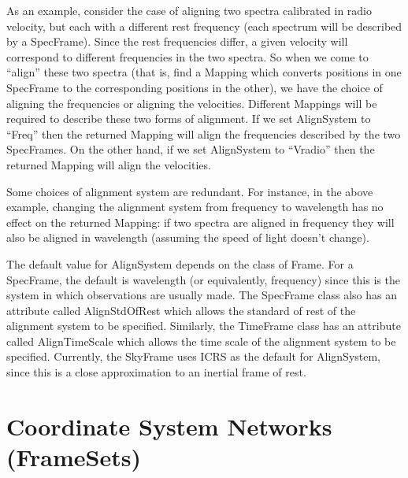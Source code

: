 \documentclass[twoside,11pt]{article}
\begin{document}
As an example, consider the case of aligning two spectra calibrated in
radio velocity, but each with a different rest frequency (each spectrum
will be described by a SpecFrame). Since the rest frequencies differ, a
given velocity will correspond to different frequencies in the two
spectra. So when we come to ``align'' these two spectra (that is, find a
Mapping which converts positions in one SpecFrame to the corresponding
positions in the other), we have the choice of aligning the frequencies
or aligning the velocities. Different Mappings will be required to
describe these two forms of alignment. If we set AlignSystem to ``Freq''
then the returned Mapping will align the frequencies described by the two
SpecFrames. On the other hand, if we set AlignSystem to ``Vradio''
then the returned Mapping will align the velocities.

Some choices of alignment system are redundant. For instance, in the
above example, changing the alignment system from frequency to wavelength
has no effect on the returned Mapping: if two spectra are aligned in
frequency they will also be aligned in wavelength (assuming the speed of
light doesn't change).

The default value for AlignSystem depends on the class of Frame. For a
SpecFrame, the default is wavelength (or equivalently, frequency)
since this is the system in which observations are usually made. The
SpecFrame class also has an attribute called AlignStdOfRest which
allows the standard of rest of the alignment system to be specified.
Similarly, the TimeFrame class has an attribute called AlignTimeScale
which allows the time scale of the alignment system to be specified.
Currently, the SkyFrame uses ICRS as the default for AlignSystem, since
this is a close approximation to an inertial frame of rest.

\cleardoublepage
\section{\label{ss:framesets}Coordinate System Networks (FrameSets)}
\end{document}

